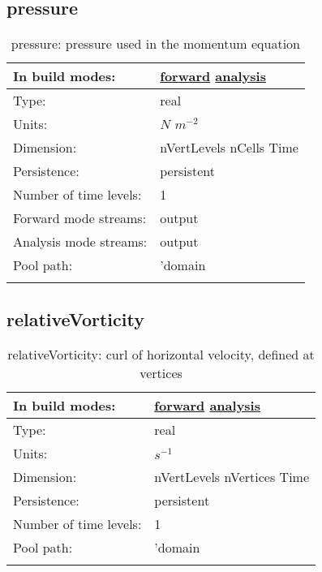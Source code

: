 \subsection[pressure]{pressure}
\label{subsec:var_sec_diagnostics_pressure}
\begin{center}
\begin{longtable}{| p{2.0in} | p{4.0in} |}
        \hline 
        In build modes: & \hyperref[subsec:forward_var_tab_diagnostics]{forward} \hyperref[subsec:analysis_var_tab_diagnostics]{analysis} \\
        \hline 
        Type: & real \\
        \hline 
        Units: & $N$ $m^{-2}$ \\
        \hline 
        Dimension: & nVertLevels nCells Time \\
        \hline 
        Persistence: & persistent \\
        \hline 
        Number of time levels: & 1 \\
        \hline 
		 Forward mode streams: &  output \\
        \hline 
		 Analysis mode streams: &  output \\
        \hline 
            Pool path: & 'domain %
 \\
		 \hline 
    \caption{pressure: pressure used in the momentum equation}
\end{longtable}
\end{center}
\subsection[relativeVorticity]{relativeVorticity}
\label{subsec:var_sec_diagnostics_relativeVorticity}
\begin{center}
\begin{longtable}{| p{2.0in} | p{4.0in} |}
        \hline 
        In build modes: & \hyperref[subsec:forward_var_tab_diagnostics]{forward} \hyperref[subsec:analysis_var_tab_diagnostics]{analysis} \\
        \hline 
        Type: & real \\
        \hline 
        Units: & $s^{-1}$ \\
        \hline 
        Dimension: & nVertLevels nVertices Time \\
        \hline 
        Persistence: & persistent \\
        \hline 
        Number of time levels: & 1 \\
        \hline 
            Pool path: & 'domain %
 \\
		 \hline 
    \caption{relativeVorticity: curl of horizontal velocity, defined at vertices}
\end{longtable}
\end{center}
